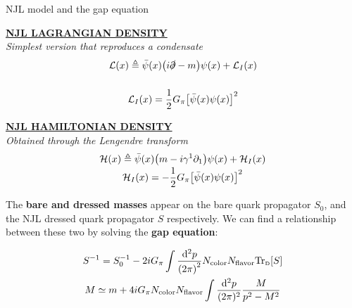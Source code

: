 \documentclass[9pt, aspectratio=169]{beamer}
\begin{document}
\begin{frame}{NJL model and the gap equation}

	\begin{multicols}{2}

		\begin{center}
			\underline{\textbf{NJL LAGRANGIAN DENSITY}}\\
			\small{\emph{Simplest version that reproduces a condensate}}
			\begin{gather*}
				\vspace{0.4em}
				\mathcal{L}(x) \defeq
			    \bar{\psi}(x) \qty(i\slashed{\partial}-m) \psi(x) + \mathcal{L}_{I}(x)
					\\[10pt]
				\mathcal{L}_{I}(x) =
			    \frac{1}{2} G_{\pi} \qty[\bar{\psi}(x)\psi(x)]^2
			\end{gather*}
		\end{center}

		\columnbreak

		\begin{center}
			\underline{\textbf{NJL HAMILTONIAN DENSITY}}\\
			\small{\emph{Obtained through the Lengendre transform}}
			\begin{gather*}
				\vspace{-1em}
			  \mathcal{H}(x) \defeq
			    \bar{\psi}(x)\qty(m - i\gamma^{1}\partial_{1})\psi(x) + \mathcal{H}_{I}(x) \\[8pt]
				\mathcal{H}_{I}(x) =
		    	- \frac{1}{2} G_{\pi} \qty[\bar{\psi}(x)\psi(x)]^{2}
			\end{gather*}
		\end{center}

	\end{multicols}

	\vspace{1em} \pause

	The \textbf{bare and dressed masses} appear on the bare quark propagator $S_{0}$, and the NJL dressed quark propagator $S$ respectively. We can find a relationship between these two by solving the \textbf{gap equation}:

	\begin{gather*}
		S^{-1} =
			S_{0}^{-1} - 2iG_{\pi} \int \frac{\dd[2]{p}}{\qty(2\pi)^{2}}
			N_\text{color} N_\text{flavor} \text{Tr}_\text{\tiny{D}}\qty[S] \\
	  M \simeq
	    m + 4iG_\pi N_\text{color} N_\text{flavor}
	    \int \frac{\dd[2]{p}}{(2\pi)^2} \frac{M}{p^2 - M^2}
	\end{gather*}

\end{frame}
\end{document}
